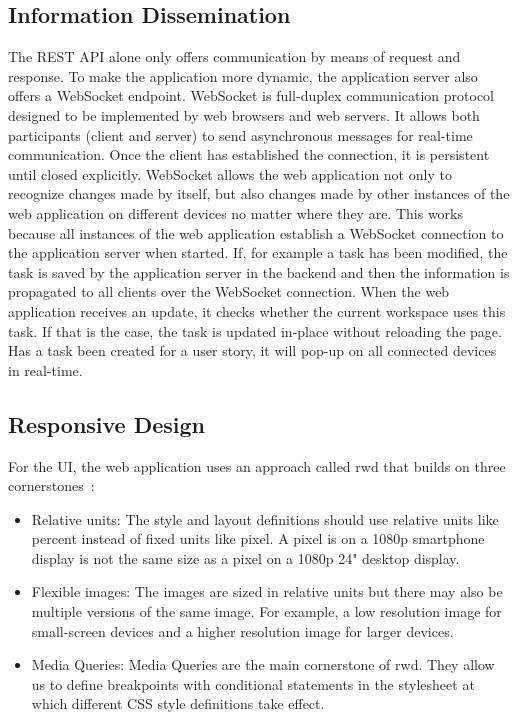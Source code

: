 \documentclass{sigchi}
\begin{document}
\subsection{Information Dissemination}
The REST API alone only offers communication by means of request and response.
To make the application more dynamic, the application server also offers a WebSocket \cite{websocketRFC} endpoint.
WebSocket is full-duplex communication protocol designed to be implemented by web browsers and web servers.
It allows both participants (client and server) to send asynchronous messages for real-time communication.
Once the client has established the connection, it is persistent until closed explicitly.
WebSocket allows the web application not only to recognize changes made by itself, but also changes made by other instances of the web application on different devices no matter where they are.
This works because all instances of the web application establish a WebSocket connection to the application server when started.
If, for example a task has been modified, the task is saved by the application server in the backend and then the information is propagated to all clients over the WebSocket connection.
When the web application receives an update, it checks whether the current workspace uses this task.
If that is the case, the task is updated in-place without reloading the page.
Has a task been created for a user story, it will pop-up on all connected devices in real-time.

\subsection{Responsive Design}
For the UI, the web application uses an approach called \gls{rwd} that builds on three cornerstones~\cite{Marcotte:2011}:
\begin{itemize}
	\item Relative units: The style and layout definitions should use relative units like percent instead of fixed units like pixel. A pixel is on a 1080p smartphone display is not the same size as a pixel on a 1080p 24" desktop display. 
	\item Flexible images: The images are sized in relative units but there may also be multiple versions of the same image. For example, a low resolution image for small-screen devices and a higher resolution image for larger devices.
	\item Media Queries: Media Queries are the main cornerstone of \gls{rwd}. They allow us to define breakpoints with conditional statements in the stylesheet at which different CSS style definitions take effect.
\end{itemize}
\end{document}
